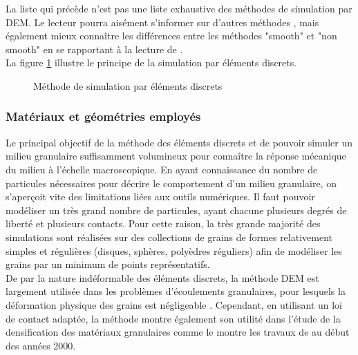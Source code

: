 			La liste qui précède n'est pas une liste exhaustive des méthodes de simulation par DEM. Le lecteur pourra aisément s'informer sur d'autres méthodes \citep{bardet_introduction_1998}, mais également mieux connaître les différences entre les méthodes "smooth" et "non smooth" en se rapportant à la lecture de \citet{wolf_modelling_1996}.
			\\La figure \ref{fig03:principe_DEM} illustre le principe de la simulation par éléments discrets.
			\begin{figure}\centering
				\caption{\label{fig03:principe_DEM}Méthode de simulation par éléments discrets}
			\end{figure}
		\subsubsection{Matériaux et géométries employés}
			Le principal objectif de la méthode des éléments discrets et de pouvoir simuler un milieu granulaire suffisamment volumineux pour connaître la réponse mécanique du milieu à l'échelle macroscopique. En ayant connaissance du nombre de particules nécessaires pour décrire le comportement d'un milieu granulaire, on s'aperçoit vite des limitations liées aux outils numériques. Il faut pouvoir modéliser un très grand nombre de particules, ayant chacune plusieurs degrés de liberté et plusieurs contacts. Pour cette raison, la très grande majorité des simulations sont réalisées sur des collections de grains de formes relativement simples et régulières (disques, sphères, polyèdres réguliers) afin de modéliser les grains par un minimum de points représentatifs.
			\\De par la nature indéformable des éléments discrets, la méthode DEM est largement utilisée dans les problèmes d'écoulements granulaires, pour lesquels la déformation physique des grains est négligeable \citep{vu-quoc_accurate_1999, vu-quoc_normal_2001, wu_experimental_2003}. Cependant, en utilisant un loi de contact adaptée, la méthode montre également son utilité dans l'étude de la densification des matériaux granulaires comme le montre les travaux de \citet{heyliger_cold_2001, martin_study_2003, martin_study_2003-1, skrinjar_discrete_2004} au début des années 2000.
